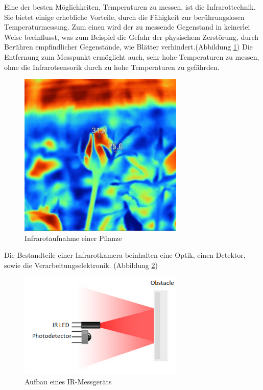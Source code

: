 Eine der besten Möglichkeiten, Temperaturen zu messen, ist die Infrarottechnik.
Sie bietet einige erhebliche Vorteile, durch die Fähigkeit zur berührungslosen
Temperaturmessung. Zum einen wird der zu messende Gegenstand in keinerlei Weise
beeinflusst, was zum Beispiel die Gefahr der physischem Zerstörung, durch
Berühren empfindlicher Gegenstände, wie Blätter verhindert.(Abbildung
\ref{fig:infrarot_pflanze}) Die Entfernung zum Messpunkt ermöglicht auch, sehr
hohe Temperaturen zu messen, ohne die Infrarotsensorik durch zu hohe
Temperaturen zu gefährden. \begin{figure}[!h]
	\centering
	\includegraphics[width=0.7\textwidth]{bilder/Measuring-crop-temperatures .jpeg}
	\caption[Infrarotaufnahme einer Pflanze]{Infrarotaufnahme einer Pflanze\cite{IRPflanze}}
	\label{fig:infrarot_pflanze}
\end{figure}

Die Bestandteile einer Infrarotkamera beinhalten eine Optik, einen Detektor,
sowie die Verarbeitungselektronik. (Abbildung \ref{fig:aufbau infrarotsensor})
\begin{figure}[ht]
	\centering
	\includegraphics[width=0.7\textwidth]{bilder/infrarotsensor.png}
	\caption[Aufbau eines IR-Messgeräts]{Aufbau eines IR-Messgeräts\cite{IR}}
	\label{fig:aufbau infrarotsensor}
\end{figure}

